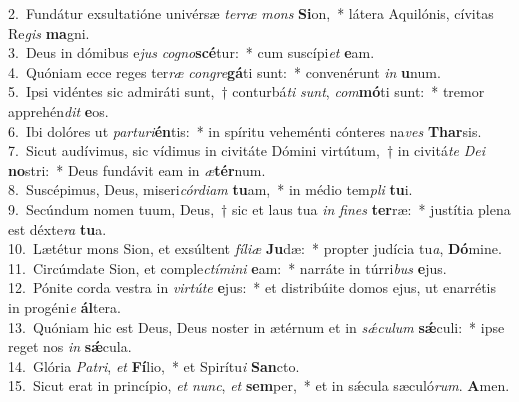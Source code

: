 {2.~}Fundátur exsultatióne univérsæ \textit{ter}\textit{ræ} \textit{mons} \textbf{Si}on,~* látera Aquilónis, cívitas Re\textit{gis} \textbf{ma}gni.\\
{3.~}Deus in dómibus e\textit{jus} \textit{co}\textit{gno}\textbf{scé}tur:~* cum suscípi\textit{et} \textbf{e}am.\\
{4.~}Quóniam ecce reges ter\textit{ræ} \textit{con}\textit{gre}\textbf{gá}ti sunt:~* convenérunt \textit{in} \textbf{u}num.\\
{5.~}Ipsi vidéntes sic admiráti sunt,~† conturbá\textit{ti} \textit{sunt}, \textit{com}\textbf{mó}ti sunt:~* tremor apprehén\textit{dit} \textbf{e}os.\\
{6.~}Ibi dolóres ut \textit{par}\textit{tu}\textit{ri}\textbf{én}tis:~* in spíritu veheménti cónteres na\textit{ves} \textbf{Thar}sis.\\
{7.~}Sicut audívimus, sic vídimus in civitáte Dómini virtútum,~† in civitá\textit{te} \textit{De}\textit{i} \textbf{no}stri:~* Deus fundávit eam in \textit{æ}\textbf{tér}num.\\
{8.~}Suscépimus, Deus, miseri\textit{cór}\textit{di}\textit{am} \textbf{tu}am,~* in médio tem\textit{pli} \textbf{tu}i.\\
{9.~}Secúndum nomen tuum, Deus,~† sic et laus tua \textit{in} \textit{fi}\textit{nes} \textbf{ter}ræ:~* justítia plena est déxte\textit{ra} \textbf{tu}a.\\
{10.~}Lætétur mons Sion, et exsúltent \textit{fí}\textit{li}\textit{æ} \textbf{Ju}dæ:~* propter judícia tu\textit{a}, \textbf{Dó}mine.\\
{11.~}Circúmdate Sion, et comple\textit{ctí}\textit{mi}\textit{ni} \textbf{e}am:~* narráte in túrri\textit{bus} \textbf{e}jus.\\
{12.~}Pónite corda vestra in \textit{vir}\textit{tú}\textit{te} \textbf{e}jus:~* et distribúite domos ejus, ut enarrétis in progéni\textit{e} \textbf{ál}tera.\\
{13.~}Quóniam hic est Deus, Deus noster in ætérnum et in \textit{sǽ}\textit{cu}\textit{lum} \textbf{sǽ}culi:~* ipse reget nos \textit{in} \textbf{sǽ}cula.\\
{14.~}Glória \textit{Pa}\textit{tri}, \textit{et} \textbf{Fí}lio,~* et Spirítu\textit{i} \textbf{San}cto.\\
{15.~}Sicut erat in princípio, \textit{et} \textit{nunc}, \textit{et} \textbf{sem}per,~* et in sǽcula sæculó\textit{rum}. \textbf{A}men.\\
